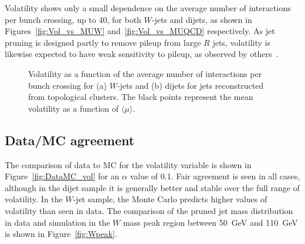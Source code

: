Volatility shows only a small dependence on the average number of interactions per bunch crossing, up to 40, for both $W$-jets and dijets, as shown in Figures~\ref{fig:Vol_vs_MUW} and~\ref{fig:Vol_vs_MUQCD} respectively. As jet pruning is designed partly to remove pileup from large $R$ jets, volatility is likewise expected to have weak sensitivity to pileup, as observed by others~\cite{pruning2009,Khachatryan:2014gha}. 

\begin{figure}[htbp]
\centering
{}
\caption{Volatility as a function of the average number of interactions per bunch crossing for (a) $W$-jets and (b) dijets for jets reconstructed from topological clusters. The black points represent the mean volatility as a function of $\langle\mu\rangle$.}
\end{figure}

\subsection{Data/MC agreement}
\label{app:qjets:jetvol:datamc}

The comparison of data to MC for the volatility variable is shown in Figure~\ref{fig:DataMC_vol} for an $\alpha$ value of 0.1. Fair agreement is seen in all cases, although in the dijet sample it is generally better and stable over the full range of volatility. In the $W$-jet sample, the Monte Carlo predicts higher values of volatility than seen in data. The comparison of the pruned jet mass distribution in data and simulation in the $W$ mass peak region between 50~GeV and 110~GeV is shown in Figure~\ref{fig:Wpeak}.

